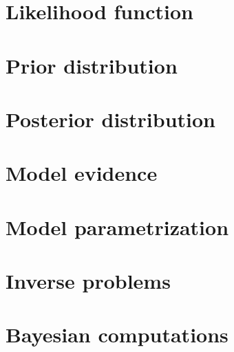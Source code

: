 \begin{refsection}


\section{Likelihood function} \label{sec:Bayesian:LikelihoodFunction}


\section{Prior distribution} \label{sec:Bayesian:PriorDistribution}


\section{Posterior distribution} \label{sec:Bayesian:PosteriorDistribution}


\section{Model evidence} \label{sec:Bayesian:ModelEvidence}


\section{Model parametrization} \label{sec:Bayesian:ModelParametrization}


\section{Inverse problems} \label{sec:Bayesian:InverseProblems}


\section{Bayesian computations} \label{sec:Bayesian:BayesianComputations}


\printbibliography[heading=subbibliography]
\end{refsection}